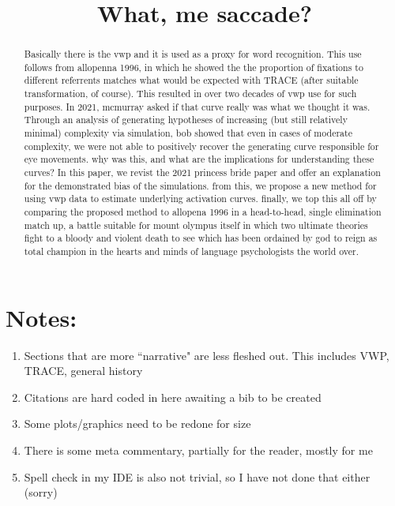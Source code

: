 \documentclass{article}
\title{What, me saccade?}
\date{}
\begin{document}

\maketitle

%

\begin{abstract}
Basically there is the vwp and it is used as a proxy for word recognition. This use follows from allopenna 1996, in which he showed the the proportion of fixations to different referrents matches what would be expected with TRACE (after suitable transformation, of course). This resulted in over two decades of vwp use for such purposes. In 2021, mcmurray asked if that curve really was what we thought it was. Through an analysis of generating hypotheses of increasing (but still relatively minimal) complexity via simulation, bob showed that even in cases of moderate complexity, we were not able to positively recover the generating curve responsible for eye movements. why was this, and what are the implications for understanding these curves? In this paper, we revist the 2021 princess bride paper and offer an explanation for the demonstrated bias of the simulations. from this, we propose a new method for using vwp data to estimate underlying activation curves. finally, we top this all off by comparing the proposed method to allopena 1996 in a head-to-head, single elimination match up, a battle suitable for mount olympus itself in which two ultimate theories fight to a bloody and violent death to see which has been ordained by god to reign as total champion in the hearts and minds of language psychologists the world over.
\end{abstract}

\section*{Notes:}

\begin{singlespace}
\begin{enumerate}
\vspace{-3mm}
\item Sections that are more ``narrative" are less fleshed out. This includes VWP, TRACE, general history
\item Citations are hard coded in here awaiting a bib to be created
\item Some plots/graphics need to be redone for size
\item There is some meta commentary, partially for the reader, mostly for me
\item Spell check in my IDE is also not trivial, so I have not done that either (sorry)
\end{enumerate}
\end{singlespace}
\end{document}
